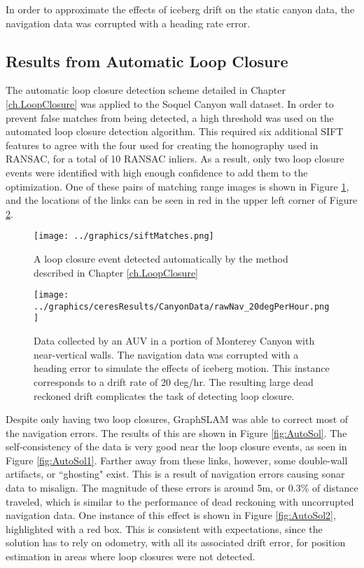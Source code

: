 In order to approximate the effects of iceberg drift on the static canyon data, the navigation data was corrupted with a heading rate error. 

\subsection{Results from Automatic Loop Closure}

The automatic loop closure detection scheme detailed in Chapter \ref{ch.LoopClosure} was applied to the Soquel Canyon wall dataset. In order to prevent false matches from being detected, a high threshold was used on the automated loop closure detection algorithm. This required six additional SIFT features to agree with the four used for creating the homography used in RANSAC, for a total of 10 RANSAC inliers. As a result, only two loop closure events were identified with high enough confidence to add them to the optimization.  One of these pairs of matching range images is shown in Figure \ref{fig:autoLC}, and the locations of the links can be seen in red in the upper left corner of Figure \ref{fig:RealDataWithDrift}.

 \begin{figure}[!htb]
   \centering
   \texttt{[image: ../graphics/siftMatches.png]} %
   \caption{A loop closure event detected automatically by the method described in Chapter \ref{ch.LoopClosure}}
   \label{fig:autoLC}
\end{figure}

 \begin{figure}[!htb]
   \centering
   \texttt{[image: ../graphics/ceresResults/CanyonData/rawNav\_20degPerHour.png]} %
   \caption{Data collected by an AUV in a portion of Monterey Canyon with near-vertical walls. The navigation data was corrupted with a heading error to simulate the effects of iceberg motion. This instance corresponds to a drift rate of 20 deg/hr. The resulting large dead reckoned drift complicates the task of detecting loop closure.}
   \label{fig:RealDataWithDrift}
\end{figure}

Despite only having two loop closures, GraphSLAM was able to correct most of the navigation errors. The results of this are shown in Figure \ref{fig:AutoSol}. The self-consistency of the data is very good near the loop closure events, as seen in Figure \ref{fig:AutoSol1}. Farther away from these links, however, some double-wall artifacts, or ``ghosting" exist. This is a result of navigation errors causing sonar data to misalign. The magnitude of these errors is around 5m, or 0.3\% of distance traveled, which is similar to the performance of dead reckoning with uncorrupted navigation data. One instance of this effect is shown in Figure \ref{fig:AutoSol2}, highlighted with a red box. This is consistent with expectations, since the solution has to rely on odometry, with all its associated drift error, for position estimation in areas where loop closures were not detected. 

